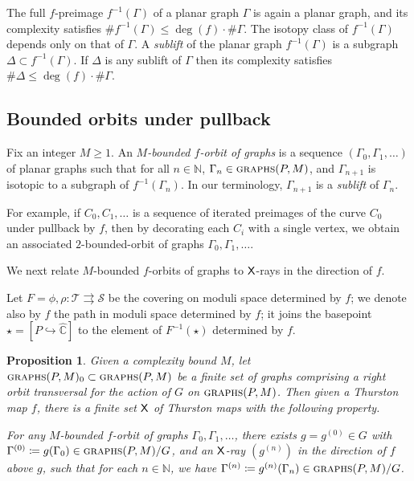 \documentclass{amsart}
\newcommand\C{{\mathbb{C}}}
\newcommand\N{{\mathbb{N}}}
\newcommand\Pone{{\widehat\C}}
\newtheorem{prop}[thm]{Proposition}
\theoremstyle{definition}
\theoremstyle{remark}
\newcommand{\sfX}{{\sf X}}
\newcommand{\cT}{\mathcal{T}}
\newcommand{\cS}{\mathcal{S}}
\newcommand{\graphs}{\text{\sc{graphs}}}
\begin{document}
The full $f$-preimage $f^{-1}(\Gamma)$ of a planar graph $\Gamma$ is again a planar graph, and  its complexity satisfies $\#f^{-1}(\Gamma) \leq \deg(f)\cdot \#\Gamma$. The isotopy class of $f^{-1}(\Gamma)$ depends only on that of $\Gamma$. A \emph{sublift} of the planar graph $f^{-1}(\Gamma)$ is a subgraph $\Delta \subset f^{-1}(\Gamma)$. If $\Delta$ is any sublift of $\Gamma$ then its complexity satisfies $\#\Delta \leq \deg(f) \cdot \#\Gamma$. 

\subsection{Bounded orbits under pullback}
Fix an integer $M \geq 1$.  An \emph{$M$-bounded $f$-orbit of graphs} is a sequence $(\Gamma_0,\Gamma_1,\dots)$ of planar graphs such that for all $n\in\N$, $\Gamma_n\in \graphs(P,M)$, and $\Gamma_{n+1}$ is isotopic to a subgraph of $f^{-1}(\Gamma_n)$. In our terminology, $\Gamma_{n+1}$ is a \emph{sublift} of $\Gamma_n$.

For example, if $C_0, C_1,\ldots $ is a sequence of iterated preimages of the curve $C_0$ under pullback by $f$, then by decorating each $C_i$ with a single vertex, we obtain an associated $2$-bounded-orbit of graphs $\Gamma_0, \Gamma_1, \ldots$.

We next relate $M$-bounded $f$-orbits of graphs to $\sfX$-rays in the direction of $f$. 

Let $F=\phi, \rho\colon \cT \rightrightarrows\cS$ be the covering on moduli space determined by $f$; we denote also by $f$ the path in moduli space determined by $f$; it joins the basepoint $\star=[P \hookrightarrow \Pone]$ to the element of $F^{-1}(\star)$ determined by $f$.

\begin{prop}\label{prop:getxray}
Given a complexity bound $M$, let $\graphs(P,M)_0 \subset \graphs(P,M)$ be a finite set of graphs comprising a right orbit transversal for the action of $G$ on $\graphs(P,M)$.  Then given a Thurston map $f$, there is a finite set $\sfX$ of Thurston maps with the following property.

For any $M$-bounded $f$-orbit of graphs $\Gamma_0, \Gamma_1, \ldots$, there exists $g=g^{(0)}\in G$ with $\Gamma^{(0)}\coloneqq g(\Gamma_0)\in \graphs(P,M)/G$, and an $\sfX$-ray $(g^{(n)})$ in the direction of $f$ above $g$, such that for each $n\in \N$, we have $\Gamma^{(n)}\coloneqq g^{(n)}(\Gamma_n)\in \graphs(P,M)/G$.
\end{prop}    
\end{document}
